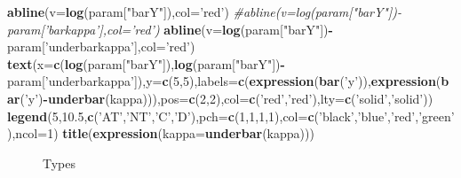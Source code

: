 \documentclass[]{book}
\newenvironment{Shaded}{\begin{snugshade}}{\end{snugshade}}
\newcommand{\CommentTok}[1]{\textcolor[rgb]{0.56,0.35,0.01}{\textit{#1}}}
\newcommand{\DataTypeTok}[1]{\textcolor[rgb]{0.13,0.29,0.53}{#1}}
\newcommand{\DecValTok}[1]{\textcolor[rgb]{0.00,0.00,0.81}{#1}}
\newcommand{\FloatTok}[1]{\textcolor[rgb]{0.00,0.00,0.81}{#1}}
\newcommand{\KeywordTok}[1]{\textcolor[rgb]{0.13,0.29,0.53}{\textbf{#1}}}
\newcommand{\NormalTok}[1]{#1}
\newcommand{\OperatorTok}[1]{\textcolor[rgb]{0.81,0.36,0.00}{\textbf{#1}}}
\newcommand{\StringTok}[1]{\textcolor[rgb]{0.31,0.60,0.02}{#1}}
\theoremstyle{definition}
\theoremstyle{definition}
\theoremstyle{definition}
\theoremstyle{remark}
\begin{document}
\begin{Shaded}
\begin{Highlighting}[]
\KeywordTok{abline}\NormalTok{(}\DataTypeTok{v=}\KeywordTok{log}\NormalTok{(param[}\StringTok{"barY"}\NormalTok{]),}\DataTypeTok{col=}\StringTok{'red'}\NormalTok{)}
\CommentTok{#abline(v=log(param["barY"])-param['barkappa'],col='red')}
\KeywordTok{abline}\NormalTok{(}\DataTypeTok{v=}\KeywordTok{log}\NormalTok{(param[}\StringTok{"barY"}\NormalTok{])}\OperatorTok{-}\NormalTok{param[}\StringTok{'underbarkappa'}\NormalTok{],}\DataTypeTok{col=}\StringTok{'red'}\NormalTok{)}
\KeywordTok{text}\NormalTok{(}\DataTypeTok{x=}\KeywordTok{c}\NormalTok{(}\KeywordTok{log}\NormalTok{(param[}\StringTok{"barY"}\NormalTok{]),}\KeywordTok{log}\NormalTok{(param[}\StringTok{"barY"}\NormalTok{])}\OperatorTok{-}\NormalTok{param[}\StringTok{'underbarkappa'}\NormalTok{]),}\DataTypeTok{y=}\KeywordTok{c}\NormalTok{(}\DecValTok{5}\NormalTok{,}\DecValTok{5}\NormalTok{),}\DataTypeTok{labels=}\KeywordTok{c}\NormalTok{(}\KeywordTok{expression}\NormalTok{(}\KeywordTok{bar}\NormalTok{(}\StringTok{'y'}\NormalTok{)),}\KeywordTok{expression}\NormalTok{(}\KeywordTok{bar}\NormalTok{(}\StringTok{'y'}\NormalTok{)}\OperatorTok{-}\KeywordTok{underbar}\NormalTok{(kappa))),}\DataTypeTok{pos=}\KeywordTok{c}\NormalTok{(}\DecValTok{2}\NormalTok{,}\DecValTok{2}\NormalTok{),}\DataTypeTok{col=}\KeywordTok{c}\NormalTok{(}\StringTok{'red'}\NormalTok{,}\StringTok{'red'}\NormalTok{),}\DataTypeTok{lty=}\KeywordTok{c}\NormalTok{(}\StringTok{'solid'}\NormalTok{,}\StringTok{'solid'}\NormalTok{))}
\KeywordTok{legend}\NormalTok{(}\DecValTok{5}\NormalTok{,}\FloatTok{10.5}\NormalTok{,}\KeywordTok{c}\NormalTok{(}\StringTok{'AT'}\NormalTok{,}\StringTok{'NT'}\NormalTok{,}\StringTok{'C'}\NormalTok{,}\StringTok{'D'}\NormalTok{),}\DataTypeTok{pch=}\KeywordTok{c}\NormalTok{(}\DecValTok{1}\NormalTok{,}\DecValTok{1}\NormalTok{,}\DecValTok{1}\NormalTok{,}\DecValTok{1}\NormalTok{),}\DataTypeTok{col=}\KeywordTok{c}\NormalTok{(}\StringTok{'black'}\NormalTok{,}\StringTok{'blue'}\NormalTok{,}\StringTok{'red'}\NormalTok{,}\StringTok{'green'}\NormalTok{),}\DataTypeTok{ncol=}\DecValTok{1}\NormalTok{)}
\KeywordTok{title}\NormalTok{(}\KeywordTok{expression}\NormalTok{(}\DataTypeTok{kappa=}\KeywordTok{underbar}\NormalTok{(kappa)))}
\end{Highlighting}
\end{Shaded}

\begin{figure}[htbp]

{\centering {}

}

\caption{Types}\label{fig:plottypes}
\end{figure}
\end{document}

